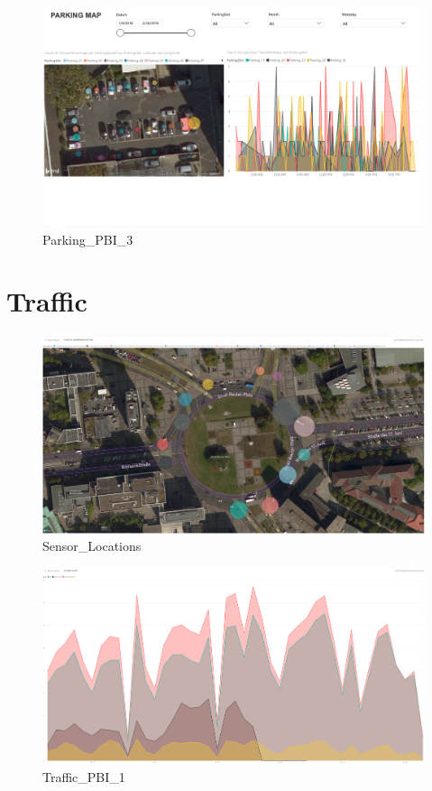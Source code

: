 \documentclass[11pt]{article}
\makeatletter
\def\maxwidth{\ifdim\Gin@nat@width>\linewidth\linewidth
    \else\Gin@nat@width\fi}
\let\Oldincludegraphics\includegraphics
\renewcommand{\includegraphics}[1]{\Oldincludegraphics[width=.8\maxwidth]{#1}}
\makeatother
\begin{document}
    \begin{figure}
\centering
\includegraphics{images/_powerBI_slides/03_parkingMap.PNG}
\caption{Parking\_PBI\_3}
\end{figure}

    \section{Traffic}\label{traffic}

\begin{figure}
\centering
\includegraphics{images/_powerBI_slides/carCountSensorsMap.PNG}
\caption{Sensor\_Locations}
\end{figure}

    \begin{figure}
\centering
\includegraphics{images/_powerBI_slides/averageCarCountCalendar.PNG}
\caption{Traffic\_PBI\_1}
\end{figure}
\end{document}
